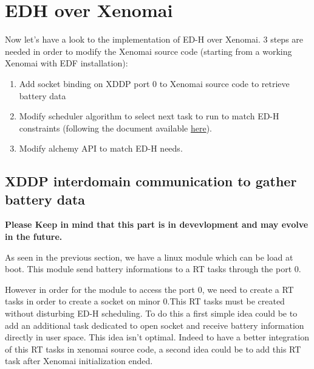 \documentclass[12pt,hidelinks]{article}
\begin{document}
{%
\newpage
\section{EDH over Xenomai}
\vspace{4cm}
    
    Now let's have a look to the implementation of ED-H over Xenomai. 3 steps are needed in order to modify the Xenomai source code (starting from a working Xenomai with EDF installation):
    \begin{enumerate}
        \item Add socket binding on XDDP port 0 to Xenomai source code to retrieve battery data
        \item Modify scheduler algorithm to select next task to run to match ED-H constraints (following the document available \href{https://hal.archives-ouvertes.fr/hal-02058575}{here}). 
        \item Modify alchemy API to match ED-H needs.
        
    \end{enumerate}
	\subsection{XDDP interdomain communication to gather battery data} \label{xddp}
	  \textbf{Please Keep in mind that this part is in devevlopment and  may evolve in the future.}
        
        As seen in the previous section, we have a linux module which can be load at boot. This module send battery informations to a RT tasks through the port 0.
        
        However in order for the module to access the port 0, we need to create a RT tasks in order to create a socket on minor 0.This RT tasks must be created without disturbing ED-H scheduling. To do this a first simple idea could be to add an additional task dedicated to open socket and receive battery information directly in user space. This idea isn't optimal. \newline Indeed to have a better integration of this RT tasks in xenomai source code, a second idea could be to add this RT task after Xenomai initialization ended.\newline
        
}
\end{document}
